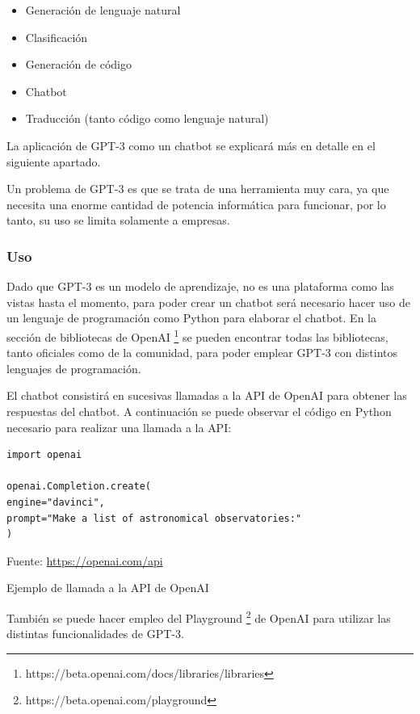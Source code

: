 \begin{itemize}
\item Generación de lenguaje natural
\item Clasificación
\item Generación de código
\item Chatbot
\item Traducción (tanto código como lenguaje natural)
\end{itemize}

La aplicación de GPT-3 como un chatbot se explicará más en detalle en el siguiente apartado.

Un problema de GPT-3 es que se trata de una herramienta muy cara, ya que necesita una enorme cantidad de potencia informática para funcionar, por lo tanto, su uso se limita solamente a empresas.

\subsubsection*{Uso}

Dado que GPT-3 es un modelo de aprendizaje, no es una plataforma como las vistas hasta el momento, para poder crear un chatbot será necesario hacer uso de un lenguaje de programación como Python para elaborar el chatbot. En la sección de bibliotecas de OpenAI \footnote{https://beta.openai.com/docs/libraries/libraries} se pueden encontrar todas las bibliotecas, tanto oficiales como de la comunidad, para poder emplear GPT-3 con distintos lenguajes de programación.

El chatbot consistirá en sucesivas llamadas a la \gls{API} de OpenAI para obtener las respuestas del chatbot. A continuación se puede observar el código en Python necesario para realizar una llamada a la \gls{API}:

\begin{lstlisting}
import openai

openai.Completion.create(
engine="davinci",
prompt="Make a list of astronomical observatories:"
)
\end{lstlisting}
\begin{center}
Fuente: \url{https://openai.com/api}
\end{center}
\begin{center}
\caption{Ejemplo de llamada a la API de OpenAI}
\end{center}

También se puede hacer empleo del Playground \footnote{https://beta.openai.com/playground} de OpenAI para utilizar las distintas funcionalidades de GPT-3.

